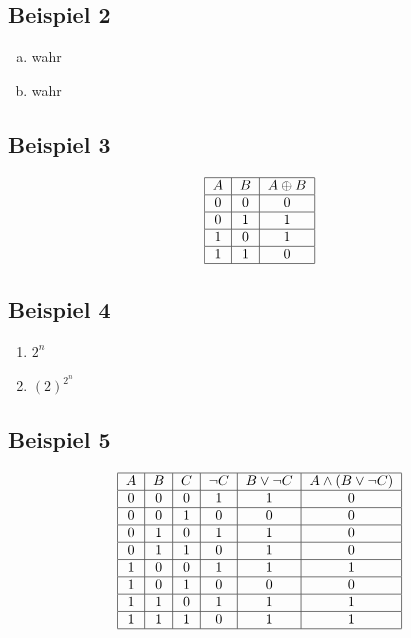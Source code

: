 \documentclass[12pt, a4paper, oneside]{article}
\begin{document}
\subsection{Beispiel 2}
\begin{enumerate}[(a)]
  \item wahr
  \item wahr
\end{enumerate}

\subsection{Beispiel 3}
\begin{equation*}
  \begin{tabular}{| c | c | c |}
    \hline
    $A$ & $B$ & $A \oplus B$ \\ \hline
    0 & 0 & 0 \\ \hline
    0 & 1 & 1 \\ \hline
    1 & 0 & 1 \\ \hline
    1 & 1 & 0 \\ \hline
  \end{tabular}
\end{equation*}

\subsection{Beispiel 4}
\begin{enumerate}
  \item $2^{n}$
  \item $(2)^{2^{n}}$
\end{enumerate}

\subsection{Beispiel 5}
\begin{equation*}
  \begin{tabular}{| c | c | c | c | c | c |}
    \hline
    $A$ & $B$ & $C$ & $\lnot C$ & $B \lor \lnot C$ & $A \land (B \lor \lnot C)$ \\ \hline
    0 & 0 & 0 & 1 & 1 & 0 \\ \hline
    0 & 0 & 1 & 0 & 0 & 0 \\ \hline
    0 & 1 & 0 & 1 & 1 & 0 \\ \hline
    0 & 1 & 1 & 0 & 1 & 0 \\ \hline
    1 & 0 & 0 & 1 & 1 & 1 \\ \hline
    1 & 0 & 1 & 0 & 0 & 0 \\ \hline
    1 & 1 & 0 & 1 & 1 & 1 \\ \hline
    1 & 1 & 1 & 0 & 1 & 1 \\ \hline
  \end{tabular}
\end{equation*}
\end{document}
